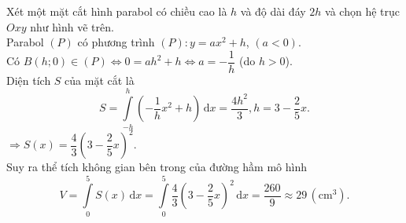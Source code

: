 \begin{ex}
{\begin{center}
	\end{center}
	Xét một mặt cắt hình parabol có chiều cao là $h$ và độ dài đáy $2h$ và chọn hệ trục $Oxy$ như hình vẽ trên.\\
	Parabol $(P)$ có phương trình $(P)\colon y=ax^2+h$, $(a<0)$.\\
	Có $B(h;0)\in(P)\Leftrightarrow 0=ah^2+h\Leftrightarrow a=-\dfrac{1}{h}$ (do $h>0$).\\
	Diện tích $S$ của mặt cắt là \[S=\displaystyle\int\limits_{-h}^h\left(-\dfrac{1}{h}{x^2}+h\right)\mathrm{\,d}x=\dfrac{4h^2}{3}, h=3-\dfrac{2}{5}x.\]
	$\Rightarrow S(x)=\dfrac{4}{3}{\left(3-\dfrac{2}{5}x\right)^2}.$\\
	Suy ra thể tích không gian bên trong của đường hầm mô hình
	\[ V=\displaystyle\int\limits_0^5S(x)\mathrm{\,d}x=\displaystyle\int\limits_0^5\dfrac{4}{3}\left(3-\dfrac{2}{5}x\right)^2\mathrm{\,d}x=\dfrac{260}{9}\approx 29\,\left(\text{cm}^3\right).\]
	}
	\end{ex}


%
